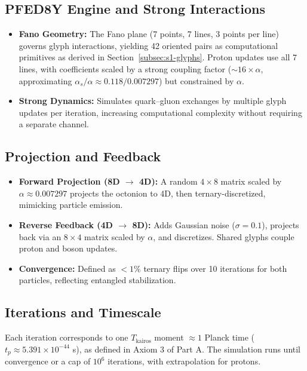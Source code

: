 \documentclass[pdflatex,sn-mathphys-num]{sn-jnl}
\theoremstyle{thmstyleone}
\theoremstyle{thmstyletwo}
\theoremstyle{thmstylethree}
\begin{document}
\subsection{PFED8Y Engine and Strong Interactions}\label{subsec:s2-PFED8Y}
\begin{itemize}
    \item \textbf{Fano Geometry:} The Fano plane (7 points, 7 lines, 3 points per line) governs glyph interactions, yielding 42 oriented pairs as computational primitives as derived in Section~\ref{subsec:s1-glyphs}. Proton updates use all 7 lines, with coefficients scaled by a strong coupling factor ($\sim 16 \times \alpha$, approximating $\alpha_s/\alpha \approx 0.118/0.007297$) but constrained by $\alpha$.
   
    \item \textbf{Strong Dynamics:} Simulates quark--gluon exchanges by multiple glyph updates per iteration, increasing computational complexity without requiring a separate channel.
\end{itemize}

\subsection{Projection and Feedback}\label{subsec:s2-projection}
\begin{itemize}
    \item \textbf{Forward Projection (8D $\rightarrow$ 4D):} A random $4 \times 8$ matrix scaled by $\alpha \approx 0.007297$ projects the octonion to 4D, then ternary-discretized, mimicking particle emission.
   
    \item \textbf{Reverse Feedback (4D $\rightarrow$ 8D):} Adds Gaussian noise ($\sigma = 0.1$), projects back via an $8 \times 4$ matrix scaled by $\alpha$, and discretizes. Shared glyphs couple proton and boson updates.
   
    \item \textbf{Convergence:} Defined as $< 1\%$ ternary flips over 10 iterations for both particles, reflecting entangled stabilization.
\end{itemize}

\subsection{Iterations and Timescale}\label{subsec:s2-iterations}
Each iteration corresponds to one $T_{\text{kairos}}$ moment $\approx 1$ Planck time ($t_p \approx 5.391 \times 10^{-44}$ s), as defined in Axiom 3 of Part A. The simulation runs until convergence or a cap of $10^6$ iterations, with extrapolation for protons.
\end{document}
